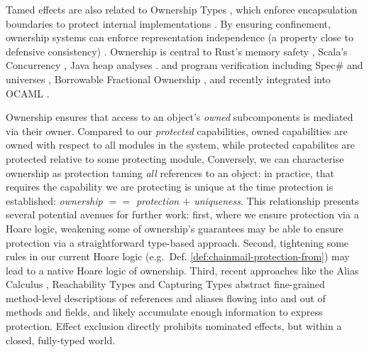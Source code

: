 
Tamed effects are also related to
Ownership Types 
\cite{simpleOwnership,existOwn},
which
enforce  encapsulation boundaries
to protect internal implementations
\cite{ownalias,NobPotVitECOOP98}.
By ensuring confinement, ownership
systems can enforce representation independence (a property close to
defensive consistency)
\cite{Banerjee:2005}.
%
Ownership is central to Rust's memory safety
\cite{RustPL2,RustBelt18},
Scala's Concurrency \cite{ScalaCapabilities,ScalaLightweightAffine},
Java heap analyses \cite{PotterNC98,HillNP02,MitECOOP06}. and
program verification
\cite{BoyLisShrPOPL03,hypervisor} including Spec$\#$
\cite{BarLeiSch05,BarDelFahLeiSch04} and universes
\cite{DieDroMue07,DietlMueller05,LuPotPOPL06},
Borrowable Fractional Ownership \cite{borrow-fract-vmcai2024},
and recently integrated into OCAML \cite{ocaml-ownership-icfp2024,funk-ownership-oopsla2024}.





Ownership ensures that access to an object's \textit{owned} 
subcomponents is mediated via their owner.
Compared to our \textit{protected} capabilities,
owned capabilities are owned with respect to all
modules in the system, 
while protected capabilites are protected relative to some
protecting module,
Conversely, we can characterise ownership as
protection taming \textit{all} references to an object: in practice,
that requires the capability we are protecting is unique at the time
protection is established: \textit{ownership $==$ protection $+$
  uniqueness}.  This relationship presents several potential avenues
for further work: first, where we ensure protection via
a Hoare logic,
weakening some 
of ownership's guarantees may be able to ensure protection via a
straightforward type-based approach.
Second,  tightening some
rules in our current Hoare logic (e.g.\ Def. \ref{def:chainmail-protection-from})
may lead to a native  Hoare logic of ownership.
Third, recent approaches like
%
%
the Alias
Calculus \cite{meyer-alias-calculus-scp2015,meyer-auto-alias-sncs2020},
Reachability
Types \cite{romf-reachability-types-oopsla2021,rompf-poly-reachability-oopsla2024}
and Capturing
Types \cite{odersky-capturing-types-toplas2023,scoped-effects-oopsla2022,odersky-reach-prog2024}
abstract fine-grained method-level descriptions of 
references and aliases flowing into and out of methods and fields,
and likely accumulate enough information to express 
protection. Effect exclusion
\cite{fx-exclusion-icfp2023} directly prohibits nominated
effects, but within a closed, fully-typed world.




